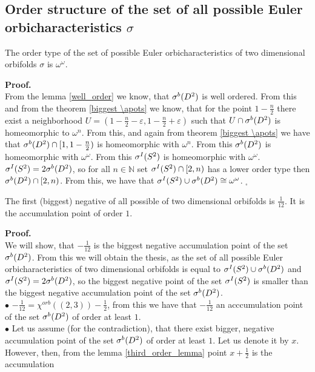 \subsection{Order structure of the set of all possible Euler orbicharacteristics $\sigma$}
\begin{theorem}
The order type of the set of possible Euler orbicharacteristics of two dimensional orbifolds 
$\sigma$ is $\omega^\omega$. 
\end{theorem}
\noindent\textbf{Proof.} \\
From the lemma \ref{well_order} we know, that ${\mathcal{\sigma}^b(D^2)}$ is well ordered. From this and 
from the theorem \ref{biggest \apots} we know, that for the point $1-\frac{n}{2}$ there exist 
a neighborhood $U=(1-\frac{n}{2}-\varepsilon,1-\frac{n}{2}+\varepsilon)$ such that $U \cap 
{\mathcal{\sigma}^b(D^2)}$ is homeomorphic to $\omega^n$. From this, and again from theorem \ref{biggest \apots} 
we have that ${\mathcal{\sigma}^b(D^2)} \cap [1,1-\frac{n}{2})$ is homeomorphic with $\omega^n$. 
From this ${\mathcal{\sigma}^b(D^2)}$ is homeomorphic with $\omega^\omega$. From this ${\mathcal{\sigma}^I(S^2)}$ is homeomorphic 
with $\omega^\omega$. \\
${\mathcal{\sigma}^I(S^2)} = 2{\mathcal{\sigma}^b(D^2)}$, so for all $n\in\mathbb{N}$ set ${\mathcal{\sigma}^I(S^2)} \cap [2,n)$ has a lower order type then 
${\mathcal{\sigma}^b(D^2)}\cap [2,n)$. From this, we have that ${\mathcal{\sigma}^I(S^2)} \cup {\mathcal{\sigma}^b(D^2)} \cong \omega^\omega$. $_\square$ 
\begin{theorem}
The first (biggest) negative \apots of all possible \Eoc of two dimensional orbifolds is 
$\frac{1}{12}$. It is the accumulation point of order $1$. 
\end{theorem}
\noindent\textbf{Proof.} \\
We will show, that $-\frac{1}{12}$ is the biggest negative accumulation point of the set ${\mathcal{\sigma}^b(D^2)}$. 
From this we will obtain the thesis, as the set of all possible Euler orbicharacteristics 
of two dimensional orbifolds is equal to ${\mathcal{\sigma}^I(S^2)} \cup {\mathcal{\sigma}^b(D^2)}$ and ${\mathcal{\sigma}^I(S^2)} = 2{\mathcal{\sigma}^b(D^2)}$, so 
the biggest negative point of the set ${\mathcal{\sigma}^I(S^2)}$ is smaller than the biggest negative accumulation 
point of the set ${\mathcal{\sigma}^b(D^2)}$. \\
$\bullet$ $-\frac{1}{12}=\chi^{orb}((2,3))-\frac{1}{2}$, from this we have that $-\frac{1}{12}$ 
an acccumulation point of the set ${\mathcal{\sigma}^b(D^2)}$ of order at least $1$. \\
$\bullet$ Let us assume (for the contradiction), that there exist bigger, negative 
accumulation point of the set ${\mathcal{\sigma}^b(D^2)}$ of order at least $1$. Let us denote it by $x$. \\
However, then, from the lemma \ref{third_order_lemma} point $x+\frac{1}{2}$ is the accumulation 
